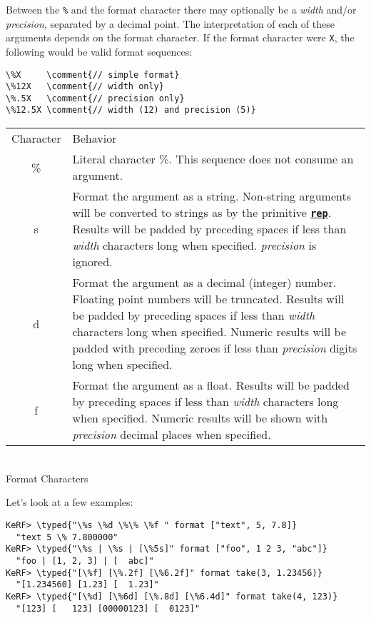 \documentclass{article}
\newcommand{\typed}[1]{\textcolor{TealBlue}{#1}}
\newcommand{\comment}[1]{\textcolor{Orange}{#1}}
\newcommand{\primu}[2]{\hyperref[prim:#2]{\textbf{\texttt{#1}}}}
\newcommand{\prim}[1]{\primu{#1}{#1}}
\begin{document}
\vspace{0.5cm}

Between the \texttt{\%} and the format character there may optionally be a \emph{width} and/or \emph{precision}, separated by a decimal point. The interpretation of each of these arguments depends on the format character. If the format character were \texttt{X}, the following would be valid format sequences:

\begin{Verbatim}
\%X     \comment{// simple format}
\%12X   \comment{// width only}
\%.5X   \comment{// precision only}
\%12.5X \comment{// width (12) and precision (5)}
\end{Verbatim}

\begin{table}[h]
	\centering
	\begin{tabular}{| c | p{11cm} |}
		\hline
		\cellcolor{tableHeaderColor} Character &
		\cellcolor{tableHeaderColor} Behavior \\
		\% & Literal character \%. This sequence does not consume an argument. \\

		s & Format the argument as a string. Non-string arguments will be converted to strings as by the primitive \prim{rep}. Results will be padded by preceding spaces if less than \emph{width} characters long when specified. \emph{precision} is ignored. \\

		d & Format the argument as a decimal (integer) number. Floating point numbers will be truncated. Results will be padded by preceding spaces if less than \emph{width} characters long when specified. Numeric results will be padded with preceding zeroes if less than \emph{precision} digits long when specified. \\

		f & Format the argument as a float. Results will be padded by preceding spaces if less than \emph{width} characters long when specified. Numeric results will be shown with \emph{precision} decimal places when specified. \\
		\hline
	\end{tabular}
	\\ \bigskip Format Characters
\end{table}

\pagebreak
Let's look at a few examples:
\begin{Verbatim}
KeRF> \typed{"\%s \%d \%\% \%f " format ["text", 5, 7.8]}
  "text 5 \% 7.800000"
KeRF> \typed{"\%s | \%s | [\%5s]" format ["foo", 1 2 3, "abc"]}
  "foo | [1, 2, 3] | [  abc]"
KeRF> \typed{"[\%f] [\%.2f] [\%6.2f]" format take(3, 1.23456)}
  "[1.234560] [1.23] [  1.23]"
KeRF> \typed{"[\%d] [\%6d] [\%.8d] [\%6.4d]" format take(4, 123)}
  "[123] [   123] [00000123] [  0123]"
\end{Verbatim}
\end{document}
